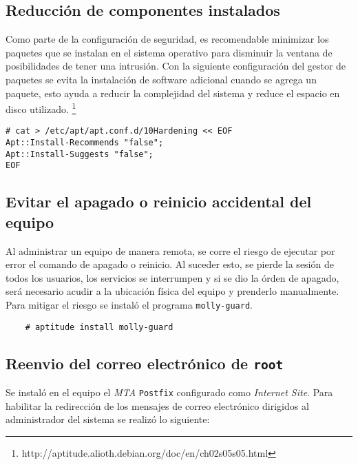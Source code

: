       \subsection {Reducci\'{o}n de componentes instalados}

Como parte de la configuraci\'{o}n de seguridad, es recomendable minimizar los paquetes que se instalan en el sistema operativo para disminuir la ventana de posibilidades de tener una intrusi\'{o}n. Con la siguiente configuraci\'{o}n del gestor de paquetes se evita la instalaci\'{o}n de software adicional cuando se agrega un paquete, esto ayuda a reducir la complejidad del sistema y reduce el espacio en disco utilizado. \footnote{http://aptitude.alioth.debian.org/doc/en/ch02s05s05.html}

{
\scriptsize
\linespread{1}
\begin{verbatim}
# cat > /etc/apt/apt.conf.d/10Hardening << EOF
Apt::Install-Recommends "false";
Apt::Install-Suggests "false";
EOF

\end{verbatim}
}

      \subsection {Evitar el apagado o reinicio accidental del equipo}

Al administrar un equipo de manera remota, se corre el riesgo de ejecutar por error el comando de apagado o reinicio. Al suceder esto, se pierde la sesi\'{o}n de todos los usuarios, los servicios se interrumpen y si se dio la \'{o}rden de apagado, ser\'{a} necesario acudir a la ubicaci\'{o}n f\'{i}sica del equipo y prenderlo manualmente. Para mitigar el riesgo se instal\'{o} el programa \texttt{molly-guard}.

{
\scriptsize
\linespread{1}
\begin{verbatim}
    # aptitude install molly-guard
\end{verbatim}
}

      \subsection {Reenvio del correo electr\'{o}nico de \texttt{root}}

Se instal\'{o} en el equipo el \textsl{MTA} \texttt{Postfix} configurado como \textit{Internet Site}. Para habilitar la redirecci\'{o}n de los mensajes de correo electr\'{o}nico dirigidos al administrador del sistema se realiz\'{o} lo siguiente:

